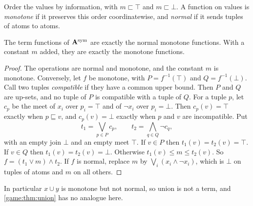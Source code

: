 Order the values by information, with $m\sqsubset\top$ and $m\sqsubset\bot$. A function on values is \emph{monotone} if it preserves this order coordinatewise, and \emph{normal} if it sends tuples of atoms to atoms.

\begin{proposition}\label{two:prop:terms}
The term functions of $\mathbf A^{\rm sym}$ are exactly the normal monotone functions. With a constant $m$ added, they are exactly the monotone functions.
\end{proposition}
\begin{proof}
The operations are normal and monotone, and the constant $m$ is monotone. Conversely, let $f$ be monotone, with $P=f^{-1}(\top)$ and $Q=f^{-1}(\bot)$. Call two tuples \emph{compatible} if they have a common upper bound. Then $P$ and $Q$ are up-sets, and no tuple of $P$ is compatible with a tuple of $Q$. For a tuple $p$, let $c_p$ be the meet of $x_i$ over $p_i=\top$ and of $\lnot x_i$ over $p_i=\bot$. Then $c_p(v)=\top$ exactly when $p\sqsubseteq v$, and $c_p(v)=\bot$ exactly when $p$ and $v$ are incompatible. Put
\[
 t_1=\bigvee_{p\in P}c_p,\qquad t_2=\bigwedge_{q\in Q}\lnot c_q,
\]
with an empty join $\bot$ and an empty meet $\top$. If $v\in P$ then $t_1(v)=t_2(v)=\top$. If $v\in Q$ then $t_1(v)=t_2(v)=\bot$. Otherwise $t_1(v)\leq m\leq t_2(v)$. So $f=(t_1\lor m)\land t_2$. If $f$ is normal, replace $m$ by $\bigvee_i(x_i\land\lnot x_i)$, which is $\bot$ on tuples of atoms and $m$ on all others.
\end{proof}

In particular $x\cup y$ is monotone but not normal, so union is not a term, and \cref{game:thm:union} has no analogue here.

